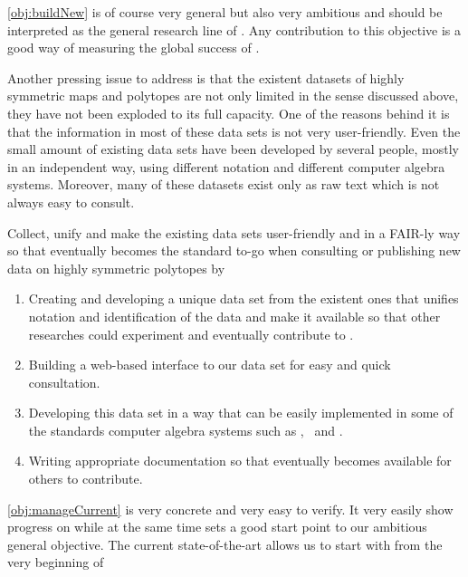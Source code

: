 \cref{obj:buildNew} is of course very general but also very ambitious and should be interpreted as the general research line of \ourp.
Any contribution to this objective is a good way of measuring the global success of \ourp.

Another pressing issue to address is that the existent datasets of highly symmetric maps and polytopes are not only limited in the sense discussed above, they have not been exploded to its full capacity.
One of the reasons behind it is that the information in most of these data sets is not very user-friendly.
Even the small amount of existing data sets have been developed by several people, mostly in an independent way, using different notation and different computer algebra systems.
Moreover, many of these datasets exist only as raw text which is not always easy to consult.


\begin{obj}\label{obj:manageCurrent}
Collect, unify and make the existing data sets user-friendly and in a FAIR-ly way so that \ourp  eventually becomes the standard to-go when consulting or publishing new data on highly symmetric polytopes by
\begin{enumerate}[label=\textit{(\roman*)}, noitemsep]
 \item Creating and developing a unique data set from the existent ones that unifies notation and identification of the data and make it available so that other researches could experiment and eventually contribute to \ourp .
\item Building a web-based interface to our data set for easy and quick consultation.
 \item Developing this data set in a way that can be easily implemented in some of the standards computer algebra systems such as \magma, \gap\ and \sage.
	\item Writing appropriate documentation so that \ourp  eventually becomes available for others to contribute.
\end{enumerate}
\end{obj}

\cref{obj:manageCurrent} is very concrete and very easy to verify. It very easily show progress on \ourp  while at the same time sets a good start point to our ambitious general objective.
The current state-of-the-art allows us to start with  from the very beginning of \ourp

